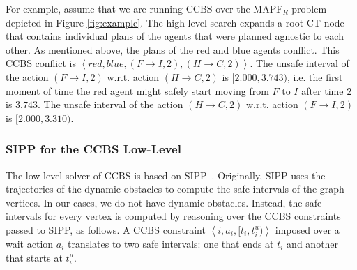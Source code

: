 \documentclass[review]{elsarticle}
\newcommand{\tuple}[1]{\ensuremath{\left \langle #1 \right \rangle }}
\newcommand\konstantin[1]{\nb{\textbf{Konstantin:}}{red}{#1}}
\newcommand{\ccbs}{\ac{CCBS}\xspace}
\newcommand{\ct}{\ac{CT}\xspace}
\newcommand{\sipp}{\ac{SIPP}\xspace}
\newcommand{\mapfr}{\ac{MAPF}$_R$\xspace}
\begin{document}

For example, assume that we are running \ccbs over the \mapfr problem depicted in Figure \ref{fig:example}. The high-level search expands a root \ct node that contains individual plans of the agents that were planned agnostic to each other. As mentioned above, the plans of the red and blue agents conflict. This \ccbs conflict is $\tuple{red, blue, (F \rightarrow I, 2), (H \rightarrow C, 2)}$. The unsafe interval of the action $(F \rightarrow I, 2)$ w.r.t. action $(H \rightarrow C, 2)$ is $[2.000,3.743)$, i.e. the first moment of time the red agent might safely start moving from $F$ to $I$ after time $2$ is $3.743$. The unsafe interval of the action $(H \rightarrow C, 2)$ w.r.t. action $(F \rightarrow I, 2)$ is $[2.000,3.310)$.



\subsubsection{\sipp for the \ccbs Low-Level}
The low-level solver of \ccbs is based on \sipp~\cite{phillips2011sipp}. 
Originally, \sipp uses the trajectories of the dynamic obstacles to compute the safe intervals of the graph vertices. In our cases, we do not have dynamic obstacles. Instead, the safe intervals for every vertex is computed by reasoning over the \ccbs constraints passed to \sipp, as follows. A \ccbs constraint $\tuple{i, a_i, [t_i, t^u_i)}$ imposed over a wait action $a_i$ translates to two safe intervals: one that ends at $t_i$ and another that starts at $t^u_i$. 
\end{document}
